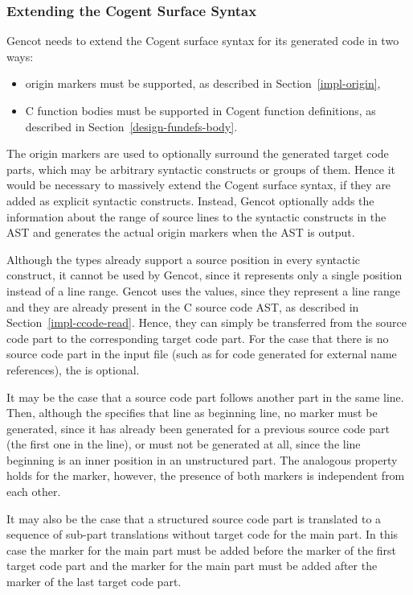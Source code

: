 \subsubsection{Extending the Cogent Surface Syntax}

Gencot needs to extend the Cogent surface syntax for its generated code in two ways:
\begin{itemize}
\item origin markers must be supported, as described in Section~\ref{impl-origin},
\item C function bodies must be supported in Cogent function definitions, as described in Section~\ref{design-fundefs-body}.
\end{itemize}

The origin markers are used to optionally surround the generated target code parts, which may be arbitrary syntactic constructs
or groups of them. Hence it would be necessary to massively extend the Cogent surface syntax, if they are added as explicit 
syntactic constructs. Instead, Gencot optionally adds the information about the range of source lines to the syntactic
constructs in the AST and generates the actual origin markers when the AST is output. 

Although the  types already support a source position in every syntactic construct, it cannot be used by Gencot,
since it represents only a single position instead of a line range. Gencot uses the  values, since they represent
a line range and they are already present in the C source code AST, as described in Section~\ref{impl-ccode-read}. Hence, they
can simply be transferred from the source code part to the corresponding target code part. For the case that there is no
source code part in the input file (such as for code generated for external name references), the  is optional.

It may be the case that a source code part follows another part in the same line. Then, although the  specifies 
that line as beginning line, no  marker must be generated, since it has already been generated for a previous 
source code part (the first one in the line), or must not be generated at all, since the line beginning is an inner position
in an unstructured part. The analogous property holds for the  marker, however, the presence of both markers
is independent from each other.

It may also be the case that a structured source code part is translated to a sequence of sub-part translations without target
code for the main part. In this case the  marker for the main part must be added before the  
marker of the first target code part and the  marker for the main part must be added after the  
marker of the last target code part. 

